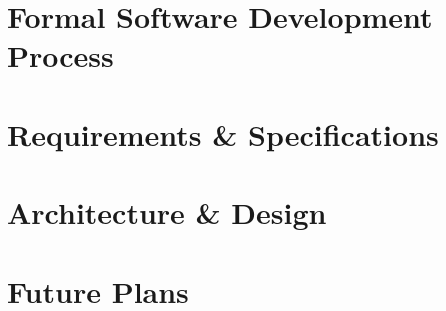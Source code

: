 \documentclass[11pt, titlepage]{article} %
\begin{document}
\clearpage
\section{Formal Software Development Process}


\clearpage
\section{Requirements \& Specifications}


\clearpage
\section{Architecture \& Design}


\clearpage
\section{Future Plans}

\end{document}
